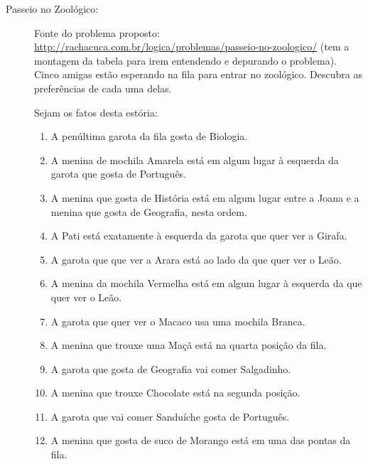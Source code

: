\documentclass[a4paper,12pt]{article}
\begin{document}
\begin{description}
\begin{enumerate}
\end{enumerate}


\newpage
  \item[Passeio no Zoológico:] Fonte do problema proposto:
  \url{http://rachacuca.com.br/logica/problemas/passeio-no-zoologico/} (tem a montagem da tabela para irem entendendo e depurando o problema).\\

Cinco amigas estão esperando na fila para entrar no zoológico. Descubra as preferências de cada uma delas.

  
Sejam os fatos desta estória:
  
  \begin{enumerate}
  
  \item   A penúltima garota da fila gosta de Biologia.
  \item A menina de mochila Amarela está em algum lugar à esquerda da garota que gosta de Português.
  \item A menina que gosta de História está em algum lugar entre a Joana e a menina que gosta de Geografia, nesta ordem.
  \item A Pati está exatamente à esquerda da garota que quer ver a Girafa.
  \item A garota que que ver a Arara está ao lado da que quer ver o Leão.
  \item A menina da mochila Vermelha está em algum lugar à esquerda da que quer ver o Leão.
  \item A garota que quer ver o Macaco usa uma mochila Branca.
  \item A menina que trouxe uma Maçã está na quarta posição da fila.
  \item A garota que gosta de Geografia vai comer Salgadinho.
  \item A menina que trouxe Chocolate está na segunda posição.
  \item A garota que vai comer Sanduíche gosta de Português.
  \item A menina que gosta de suco de Morango está em uma das pontas da fila.


\end{enumerate}
\end{description}
\end{document}
